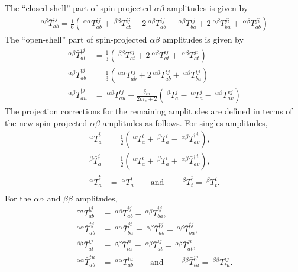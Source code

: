 \documentclass[a4paper,12pt,oneside]{book}
\begin{document}
The ``closed-shell'' part of spin-projected $\alpha\beta$ amplitudes is given by
\begin{equation}
\begin{aligned}
~^{αβ}\bar T^{ij}_{ab} = \frac{1}{6} ( ~^{αα}T^{ij}_{ab} + ~^{ββ}T^{ij}_{ab} + 2 ~^{αβ}T^{ij}_{ab} + ~^{αβ}T^{ij}_{ba} +2 ~^{αβ}T^{ji}_{ba} + ~^{αβ}T^{ji}_{ab})
\end{aligned}
\end{equation}
The ``open-shell'' part of spin-projected $\alpha\beta$ amplitudes is given by
\begin{equation}
\begin{aligned}
~^{αβ}\bar T^{ij}_{at} &= \frac{1}{3} ( ~^{ββ}T^{ij}_{at} + 2 ~^{αβ}T^{ij}_{at} + ~^{αβ}T^{ji}_{at})\\
~^{αβ}\bar T^{tj}_{ab} &= \frac{1}{3} ( ~^{αα}T^{tj}_{ab} + 2 ~^{αβ}T^{tj}_{ab} + ~^{αβ}T^{tj}_{ba})\\
~^{αβ}\bar T^{tj}_{au} &= ~^{αβ}T^{tj}_{au} + \frac{\delta_{tu}}{2m_s + 2}\left( ~^{β}T^j_a - ~^{α}T^j_a - ~^{αβ}T^{vj}_{av} \right)
\end{aligned}
\end{equation}
The projection corrections for the remaining amplitudes are defined 
in terms of the new spin-projected $\alpha\beta$ amplitudes as follows.
For singles amplitudes,
\begin{equation}
\begin{aligned}
~^{α}\bar T^i_a &= \frac{1}{2}\left(~^{α}T^i_a + ~^{β}T^i_a - ~^{αβ}\bar T^{vi}_{av} \right),\\
~^{β}\bar T^i_a &= \frac{1}{2}\left(~^{α}T^i_a + ~^{β}T^i_a + ~^{αβ}\bar T^{vi}_{av} \right),\\
~^{α}\bar T^t_a &= ~^{α}T^t_a  \qquad \text{and} \qquad ~^{β}\bar T^i_t = ~^{β} T^i_t.\\
\end{aligned}
\end{equation}
For the $\alpha\alpha$ and $\beta\beta$ amplitudes,
\begin{equation}
\begin{aligned}
~^{\sigma\sigma}\bar T^{ij}_{ab} &= ~^{αβ}\bar T^{ij}_{ab} - ~^{αβ}\bar T^{ij}_{ba},\\
~^{αα}\bar T^{tj}_{ab} &= ~^{αα}\bar T^{jt}_{ba} = ~^{αβ}\bar T^{tj}_{ab} - ~^{αβ}\bar T^{tj}_{ba},\\
~^{ββ}\bar T^{ij}_{at} &= ~^{ββ}\bar T^{ji}_{ta} = ~^{αβ}\bar T^{ij}_{at} - ~^{αβ}\bar T^{ji}_{at},\\
~^{αα}\bar T^{tu}_{ab} &= ~^{αα} T^{tu}_{ab} \qquad \text{and} \qquad ~^{ββ}\bar T^{ij}_{tu} = ~^{ββ} T^{ij}_{tu}.\\
\end{aligned}
\end{equation}
\end{document}
